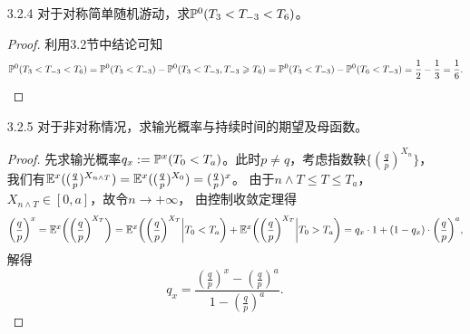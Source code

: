\begin{enumerate}
\begin{proof}
        由于$T$几乎处处有限且可积，故由单调收敛定理知$\lim\limits_{n\to\infty}\E(n\land T)=\E T$，
        结合Fatou引理知$\E X_T^2\leqslant\liminf\limits_{n\to\infty}\E X_{n\land T}^2=\E T<+\infty$，
        即$X_T\in L^2$。利用控制收敛定理可得$\lim\limits_{n\to\infty}\E(X_T^21_{\{T>n\}})=0$，又注意到
        \[X_{n\land T}^2=X_T^21_{\{T\leqslant n\}}+X_n^21_{\{T>n\}}=X_T^2-X_T^21_{\{T>n\}}+X_n^21_{\{T>n\}},\]
        结合$(\dag)$式，为证题述结论，只需再证明$\lim\limits_{n\to\infty}\E(X_n^21_{\{T>n\}})=0$即可。

        从$\E((X_T-X_n)1_{\{T>n\}}|\F_n)=0$开始。任取$A\in\F_n$，由$X_T=\sum\limits_{n=1}^\infty\xi_n1_{\{T\geqslant n\}}$
        可知\[(X_T-X_n)1_{\{T>n\}}=\sum_{k=n+1}^\infty\xi_k1_{\{T\geqslant k\}},\]与练习3.2.2类似，
        对$k\geqslant n+1$，$\xi_k$与$\F_{k-1}\supseteq\F_n$独立，故与$1_{\{T\geqslant k\}}$和$A$均独立，
        从而利用Fubini定理可知\[\E(\sum_{k=n+1}^\infty|\xi_k|1_{\{T\geqslant k\}}1_A)=
        \sum_{k=n+1}^\infty\E(|\xi_k|1_{\{T\geqslant k\}}1_A)\leqslant\E|\xi_1|\sum_{k=n+1}^\infty\P(T\geqslant k)
        \leqslant\E|\xi_1|\cdot\E T<+\infty。\]再利用控制收敛定理就有
        \[\E((X_T-X_n)1_{\{T>n\}}1_A)=\sum_{k=n+1}^\infty\E(\xi_k1_{\{T\geqslant k\}}1_A)
        =\sum_{k=n+1}^\infty\E\xi_k\cdot\E(1_{\{T\geqslant k\}}1_A)=0,\]即证$\E((X_T-X_n)1_{\{T>n\}}|\F_n)=0$。

        现在，我们有\[\E(X_n(X_T-X_n)1_{\{T>n\}})=\E(\E(X_n(X_T-X_n)1_{\{T>n\}}|\F_n))=\E(X_n\E((X_T-X_n)1_{\{T>n\}}|\F_n))=0,\]
        因此\[\E(X_T^21_{\{T>n\}})=\E((X_n+(X_T-X_n))^21_{\{T>n\}})=\E(X_n^21_{\{T>n\}})+\E((X_T-X_n)^21_{\{T>n\}})
        \geqslant\E(X_n^21_{\{T>n\}})\geqslant0,\]即证$\lim\limits_{n\to\infty}\E(X_n^21_{\{T>n\}})=0$。
    \end{proof}
    \item[3.2.4] 对于对称简单随机游动，求$\P^0(T_3<T_{-3}<T_6)$。
    \begin{proof}
        利用3.2节中结论可知\[\P^0(T_3<T_{-3}<T_6)=\P^0(T_3<T_{-3})-\P^0(T_3<T_{-3},T_{-3}\geqslant T_6)
        =\P^0(T_3<T_{-3})-\P^0(T_6<T_{-3})=\frac{1}{2}-\frac{1}{3}=\frac{1}{6}.\]
    \end{proof}
    \item[3.2.5] 对于非对称情况，求输光概率与持续时间的期望及母函数。
    \begin{proof}
        先求输光概率$q_x:=\P^x(T_0<T_a)$。此时$p\neq q$，考虑指数鞅$\{(\frac{q}{p})^{X_n}\}$，
        我们有$\E^x((\frac{q}{p})^{X_{n\land T}})=\E^x((\frac{q}{p})^{X_0})=(\frac{q}{p})^x$。
        由于$n\land T\leqslant T\leqslant T_a$，$X_{n\land T}\in[0,a]$，故令$n\to+\infty$，
        由控制收敛定理得\[\bigg(\frac{q}{p}\bigg)^x=\E^x\bigg(\bigg(\frac{q}{p}\bigg)^{X_T}\bigg)
        =\E^x\bigg(\bigg(\frac{q}{p}\bigg)^{X_T}\bigg|T_0<T_a\bigg)+\E^x\bigg(\bigg(\frac{q}{p}\bigg)^{X_T}\bigg|T_0>T_a\bigg)
        =q_x\cdot1+(1-q_x)\cdot\bigg(\frac{q}{p}\bigg)^a,\]
        解得\[q_x=\frac{(\frac{q}{p})^x-(\frac{q}{p})^a}{1-(\frac{q}{p})^a}.\]


\end{proof}
\end{enumerate}
